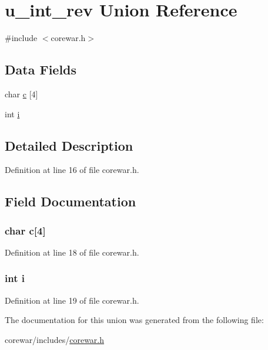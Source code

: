 \hypertarget{unionu__int__rev}{\section{u\-\_\-int\-\_\-rev Union Reference}
\label{unionu__int__rev}
}


{\ttfamily \#include $<$corewar.\-h$>$}

\subsection*{Data Fields}
\begin{DoxyCompactItemize}
\item 
char \hyperlink{unionu__int__rev_a4430fee26e106ac5b7a95a966e1de8fb}{c} \mbox{[}4\mbox{]}
\item 
int \hyperlink{unionu__int__rev_acb559820d9ca11295b4500f179ef6392}{i}
\end{DoxyCompactItemize}


\subsection{Detailed Description}


Definition at line 16 of file corewar.\-h.



\subsection{Field Documentation}
\hypertarget{unionu__int__rev_a4430fee26e106ac5b7a95a966e1de8fb}{
\subsubsection[{c}]{\setlength{\rightskip}{0pt plus 5cm}char c\mbox{[}4\mbox{]}}}\label{unionu__int__rev_a4430fee26e106ac5b7a95a966e1de8fb}


Definition at line 18 of file corewar.\-h.

\hypertarget{unionu__int__rev_acb559820d9ca11295b4500f179ef6392}{
\subsubsection[{i}]{\setlength{\rightskip}{0pt plus 5cm}int i}}\label{unionu__int__rev_acb559820d9ca11295b4500f179ef6392}


Definition at line 19 of file corewar.\-h.



The documentation for this union was generated from the following file\-:\begin{DoxyCompactItemize}
\item 
corewar/includes/\hyperlink{corewar_8h}{corewar.\-h}\end{DoxyCompactItemize}
